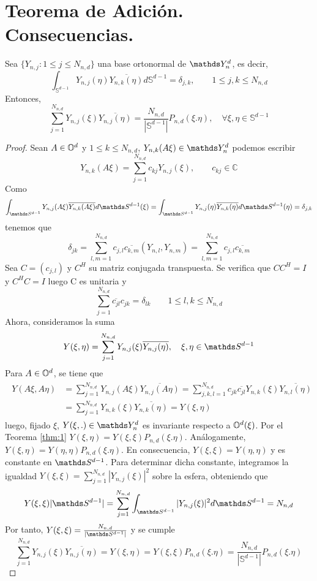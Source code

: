\section{Teorema de Adición. Consecuencias.}
\begin{thm}\label{thm_adicion}
Sea $\{Y_{n,j}:1\le j \le N_{n,d}\}$ una base ortonormal de $\spharm$, es decir,
$$
\int_{\mathds{S}^{d-1}} Y_{n,j}(\eta)\overline{Y_{n,k}(\eta)} d\mathds{S}^{d-1} = \delta_{j,k},\qquad	1 \le j,k \le N_{n,d}
$$
Entonces, 
$$
\sum_{j=1}^{N_{n,d}}Y_{n,j}(\xi)\overline{Y_{n,j}(\eta)} = \frac{N_{n,d}}{|\mathds{S}^{d-1}|}P_{n,d}(\xi.\eta)	,\quad	\forall \xi,\eta \in \mathds{S}^{d-1}
$$

\end{thm}
\begin{proof}Sean $A\in\mathbb{O}^d$ y $1\le k \le N_{n,d}$, $Y_{n,k}(A\xi)\in \spharm$ podemos escribir
$$
Y_{n,k}(A\xi) = \sum_{j=1}^{N_{n,d}} c_{kj}Y_{n,j}(\xi), \qquad  c_{kj}\in\mathds{C}
$$
Como $$
\int_{\sphere} Y_{n,j}(A\xi) \overline{Y_{n,k}(A\xi) } d\sphere(\xi) = \int_{\sphere} Y_{n,j}(\eta) \overline{Y_{n,k}(\eta) } d\sphere(\eta) =\delta_{j,k}
$$
tenemos que 
$$
\delta_{jk} = \sum_{l,m = 1}^{N_{n,d}} c_{j,l}\overline{c_{k,m}}(Y_{n,l},Y_{n,m}) = \sum_{l,m = 1}^{N_{n,d}} c_{j,l}\overline{c_{k,m}}
$$
Sea $C=(c_{j,l})$ y $C^H$ su matriz conjugada transpuesta. Se verifica que $CC^H=I$ y $C^HC=I$ luego C es unitaria y
$$
\sum_{j=1}^{N_{n,d}} \overline{c_{jl}}c_{jk} = \delta_{lk} \qquad 1\le l,k \le N_{n,d}
$$
Ahora, consideramos la suma
$$
Y(\xi,\eta) = \sum_{j=1}^{N_{n,d}} Y_{n,j}(\xi)\overline{ Y_{n,j}(\eta)} ,\quad \xi,\eta\in\sphere
$$
Para $A\in\mathbb{O}^d$, se tiene que
\begin{gather*}
\begin{aligned}
Y(A\xi,A\eta) &= \sum_{j=1}^{N_{n,d}} Y_{n,j}(A\xi)\overline{ Y_{n,j}(A\eta)} = \sum_{j,k,l=1}^{N_{n,d}} c_{jk}\overline{c_{jl}} Y_{n,k}(\xi)\overline{ Y_{n,l}(\eta)} \\&= \sum_{j=1}^{N_{n,d}} Y_{n,k}(\xi)\overline{ Y_{n,k}(\eta)} = Y(\xi,\eta)
\end{aligned}
\end{gather*}
luego, fijado $\xi$, $Y(\xi,.)\in\spharm$ es invariante respecto a $\mathbb{O}^d(\xi)$. Por el Teorema \ref{thm:1} $Y(\xi,\eta)=Y(\xi,\xi)P_{n,d}(\xi.\eta)$. Análogamente, $Y(\xi,\eta)=Y(\eta,\eta)P_{n,d}(\xi.\eta)$. En consecuencia, $Y(\xi,\xi) = Y(\eta,\eta)$ y es constante en $\sphere$. Para determinar dicha constante, integramos la igualdad  $Y(\xi,\xi) =  \sum_{j=1}^{N_{n,d}} |Y_{n,j}(\xi)|^2 $ sobre la esfera, obteniendo que
$$
Y(\xi,\xi)|\sphere| =  \sum_{j=1}^{N_{n,d}}\int_{\sphere} |Y_{n,j}(\xi)|^2 d\sphere = N_{n,d}
$$
Por tanto, $Y(\xi,\xi)=\frac{N_{n,d}}{|\sphere|}$ y se cumple $$\sum_{j=1}^{N_{n,d}}Y_{n,j}(\xi)\overline{Y_{n,j}(\eta)}= Y(\xi,\eta)=Y(\xi,\xi)P_{n,d}(\xi.\eta) = \frac{N_{n,d}}{|\mathds{S}^{d-1}|}P_{n,d}(\xi.\eta)	$$
\end{proof}

